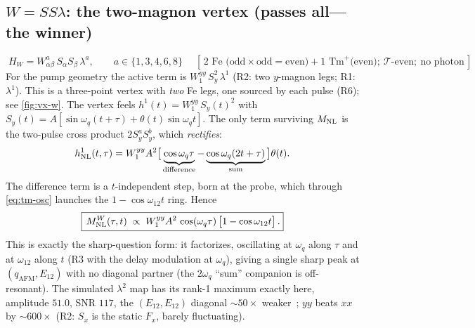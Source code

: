 \documentclass[11pt,a4paper]{article}
\begin{document}
\subsection{$W=SS\lambda$: the two-magnon vertex (passes all---the winner)}

\begin{equation}
  \boxed{\;H_W=W^a_{\alpha\beta}\,S_\alpha S_\beta\,\lambda^a,\qquad a\in\{1,3,4,6,8\}\;}
  \quad[\,\text{2 Fe (odd$\times$odd$=$even)}+\text{1 Tm}^+\text{(even)};\ \mathcal T\text{-even};\ \text{no photon}\,]
\end{equation}
For the pump geometry the active term is $W^{yy}_1\,S_y^2\,\lambda^1$ (R2: two
$y$-magnon legs; R1: $\lambda^1$).  This is a three-point vertex with \emph{two}
Fe legs, one sourced by each pulse (R6); see \cref{fig:vx-w}.  The vertex feels
$h^1(t)=W^{yy}_1\,S_y(t)^2$ with
$S_y(t)=A[\sin\omega_q(t+\tau)+\theta(t)\sin\omega_q t]$.  The only term
surviving $M_{\rm NL}$ is the two-pulse cross product $2S_y^aS_y^b$, which
\emph{rectifies}:
\begin{equation}
  h^1_{\rm NL}(t,\tau)=W^{yy}_1A^2\big[\underbrace{\cos\omega_q\tau}_{\text{difference}}
  -\underbrace{\cos\omega_q(2t+\tau)}_{\text{sum}}\big]\theta(t).
\end{equation}
The difference term is a $t$-independent step, born at the probe, which through
\eqref{eq:tm-osc} launches the $1-\cos\omega_{12}t$ ring.  Hence
\begin{equation}
  \boxed{\,M_{\rm NL}^{W}(\tau,t)\;\propto\;W^{yy}_1A^2\,\cos(\omega_q\tau)\,
  \big[1-\cos\omega_{12}t\big]\,.}
\end{equation}
This is exactly the sharp-question form: it factorizes, oscillating at $\omega_q$
along $\tau$ and at $\omega_{12}$ along $t$ (R3 with the delay modulation at
$\omega_q$), giving a single sharp peak at $(q_{\mathrm{AFM}},E_{12})$ with no
diagonal partner (the $2\omega_q$ ``sum'' companion is off-resonant).  The
simulated $\lambda^2$ map has its rank-1 maximum exactly here, amplitude $51.0$,
SNR $117$, the $(E_{12},E_{12})$ diagonal $\sim\!50\times$
weaker~\cite{HOreport}; $yy$ beats $xx$ by $\sim\!600\times$ (R2: $S_x$ is the
static $F_x$, barely fluctuating).
\end{document}
